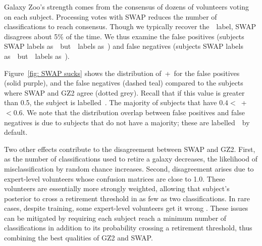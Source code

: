 Galaxy Zoo's strength comes from the consensus of dozens of volunteers voting on each subject. 
Processing votes with SWAP reduces the number of classifications to reach consensus. 
Though we typically recover the~\raw~label, SWAP disagrees about 5\% of the time. 
We thus examine the false positives (subjects SWAP labels as~\feat~but~\raw~labels as~\notfeat) and false negatives (subjects SWAP labels as~\notfeat~but~\raw~labels as~\feat).

Figure~\ref{fig: SWAP sucks} shows the distribution of~\ffeat+\fstar~for the false positives (solid purple), and the false negatives (dashed teal) compared to the
 subjects where SWAP and GZ2 agree (dotted grey).  
Recall that if this value is greater than 0.5, the subject is labelled~\feat.  
The majority of  
subjects that have $0.4 <$~\ffeat+\fstar~$< 0.6$.  
We note that the distribution overlap between false positives and false negatives is due to subjects that do not have a majority;
these are labelled~\notfeat~by default. 


Two other effects contribute to the disagreement between SWAP and GZ2. 
First, as the number of classifications used to retire a galaxy decreases, the 
likelihood of misclassification by random chance increases. 
Second, disagreement arises due to expert-level volunteers whose confusion 
matrices are close to 1.0. These volunteers are essentially more 
strongly weighted, allowing that subject's posterior to cross a retirement threshold
in as few as two classifications. In rare cases, despite training, some expert-level 
volunteers get it wrong . These issues can be mitigated by requiring each subject reach 
a minimum number of classifications in addition to its probability crossing a
retirement threshold, thus combining the best qualities of GZ2 and SWAP. 


